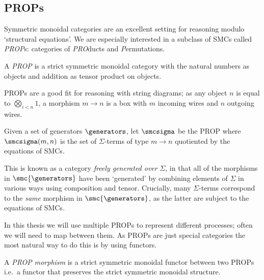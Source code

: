 \subsection{PROPs}

Symmetric monoidal categories are an excellent setting for reasoning modulo
`structural equations'.
We are especially interested in a subclass of SMCs called \emph{PROP}s:
categories of \emph{PRO}ducts and \emph{P}ermutations.

\begin{definition}\label{def:prop}
    A \emph{PROP} is a strict symmetric monoidal category with the
    natural numbers as objects and addition as tensor product on objects.
\end{definition}

PROPs are a good fit for reasoning with string diagrams; as any
object \(n\) is equal to \(\bigotimes_{i < n} 1\), a morphism
\(m \to n\) is a box with \(m\) incoming wires and \(n\) outgoing wires.

\begin{definition}\label{def:freely-generated-prop}
    Given a set of generators \(\generators\), let \(\smcsigma\) be the
    PROP where \(\smcsigma(m, n)\) is the set of \(\Sigma\)-terms of type
    \(m \to n\) quotiented by the equations of SMCs.
\end{definition}

This is known as a category \emph{freely generated over} \(\Sigma\), in that all
of the morphisms in \(\smc{\generators}\) have been `generated' by combining
elements of \(\Sigma\) in various ways using composition and tensor.
Crucially, many \(\Sigma\)-terms correspond to the \emph{same} morphism in
\(\smc{\generators}\), as the latter are subject to the equations of SMCs.

In this thesis we will use multiple PROPs to represent different processes;
often we will need to map between them.
As PROPs are just special categories the most natural way to do this is by
using functors.

\begin{definition}
    A \emph{PROP morphism} is a strict symmetric monoidal functor between two
    PROPs i.e.\ a functor that preserves the strict symmetric monoidal
    structure.
\end{definition}

